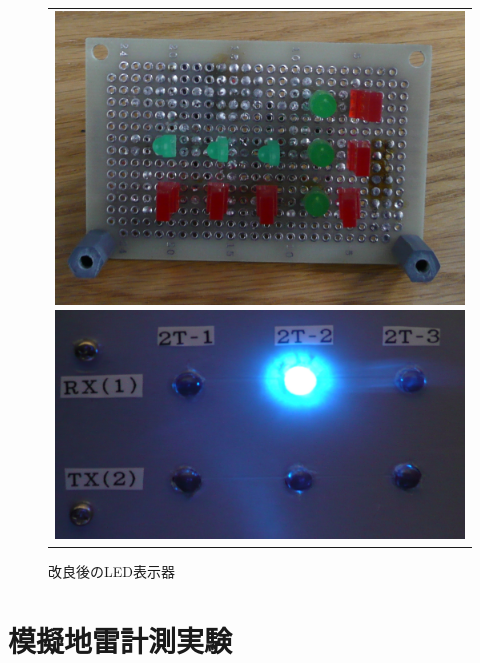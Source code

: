 ﻿\documentclass[12pt,oneside]{jsbook}
\begin{document}
\begin{figure}[btp]
 \begin{center}
  \begin{tabular}{c}
   \begin{minipage}{0.5\hsize}
\includegraphics[width =\hsize ]{LED.png}
\caption{改良前のLEDボード}
\label{LED}      
   \end{minipage}
   \begin{minipage}{0.4\hsize}
\includegraphics[width =\hsize ]{LED2.png}
\caption{改良後のLED表示器}
\label{LED2}          
   \end{minipage}
  \end{tabular}
 \end{center}
\end{figure}

\newpage
\chapter{模擬地雷計測実験}
\end{document}
